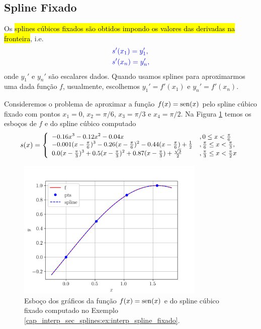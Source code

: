\subsection{Spline Fixado}

Os \hl{splines cúbicos fixados são obtidos impondo os valores das derivadas na fronteira}, i.e.
\begin{subequations}\hleq
  \begin{align}
    &s'(x_1)=y_1',\\
    &s'(x_n)=y_n',
  \end{align}
\end{subequations}
onde $y_1'$ e $y_n'$ são escalares dados. Quando usamos splines para aproximarmos uma dada função $f$, usualmente, escolhemos $y_1'=f'(x_1)$ e $y_n'=f'(x_n)$.

\begin{ex}\label{cap_interp_sec_splines:ex:interp_spline_fixado}
  Consideremos o problema de aproximar a função $f(x)=\operatorname{sen}(x)$ pelo spline cúbico fixado com pontos $x_1=0$, $x_2=\pi/6$, $x_3=\pi/3$ e $x_4=\pi/2$. Na Figura \ref{cap_interp_sec_splines:fig:interp_spline_fixado} temos os esboços de $f$ e do spline cúbico computado
  \begin{equation}
    s(x) = \small\left\{
      \begin{array}{ll}
        -0.16x^3 - 0.12x^2 - 0.04x &, 0\leq x < \frac{\pi}{6}\\
        -0.001(x-\frac{\pi}{6})^3 - 0.26(x-\frac{\pi}{6})^2 - 0.44(x-\frac{\pi}{6}) + \frac{1}{2} &, \frac{\pi}{6} \leq x < \frac{\pi}{3},\\
        0.0(x-\frac{\pi}{3})^3 + 0.5(x-\frac{\pi}{3})^2 + 0.87(x-\frac{\pi}{3}) + \frac{\sqrt{3}}{2} &, \frac{\pi}{3} \leq x < \frac{\pi}{2}x
      \end{array}
\right.
  \end{equation}

  \begin{figure}[H]
    \centering
    \includegraphics[width=0.8\textwidth]{./cap_interp/dados/fig_CSFixado/fig}
    \caption{Esboço dos gráficos da função $f(x)=\operatorname{sen}(x)$ e do spline cúbico fixado computado no Exemplo \ref{cap_interp_sec_splines:ex:interp_spline_fixado}.}
    \label{cap_interp_sec_splines:fig:interp_spline_fixado}
  \end{figure}


\end{ex}
